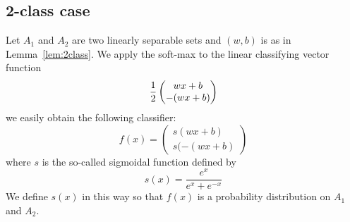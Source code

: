 \subsection{2-class case} Let $A_1$ and $A_2$ are two linearly
separable sets and $(w,b)$ is as in Lemma~\ref{lem:2class}. We apply
the soft-max to the linear classifying vector function
\begin{equation}
  \label{eq:1}
{1\over 2}
\begin{pmatrix}
  wx+b\\
-(wx+b)
\end{pmatrix}
\end{equation}
we easily obtain the following classifier:
\begin{equation}
  \label{f-sigmoidal}
f(x)=  
\begin{pmatrix}
s(wx+b)\\
s(-(wx+b)
\end{pmatrix}
\end{equation}
 where $s$ is the so-called sigmoidal function defined by
\begin{equation}
\label{sigmoidal}
s(x)=\frac{e^x}{e^x+e^{-x}}  
\end{equation}
We define $s(x)$ in this way so that $f(x)$ is a probability distribution on
$A_1$ and $A_2$.
